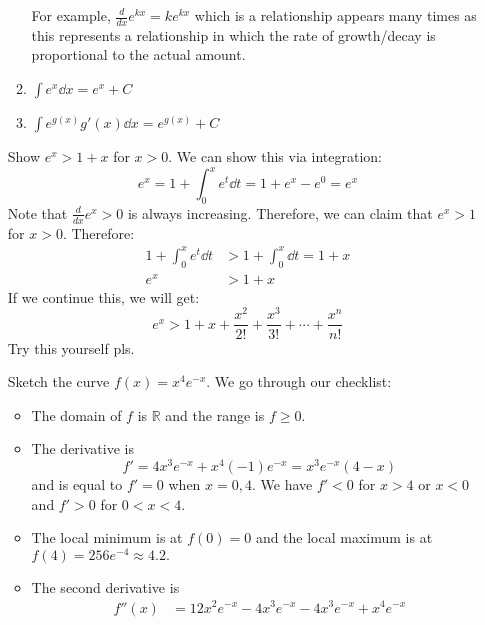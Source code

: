 \begin{itemize}
\begin{enumerate}
        For example, $\frac{d}{dx}e^{kx} = ke^{kx}$ which is a relationship appears many times as this represents a relationship in which the rate of growth/decay is proportional to the actual amount.
        \item $\int e^x \dd{x} = e^x + C$
        \item $\int e^{g(x)}g'(x) \dd{x} = e^{g(x)}+C$
    \end{enumerate}
    \begin{example}
        Show $e^x>1+x$ for $x>0$. We can show this via integration:
        \begin{equation}
            e^x = 1+ \int_0^x e^{t} \dd{t} = 1+e^x-e^0 = e^x
            \label{eq:}
        \end{equation}
        Note that $\frac{d}{dx}e^x > 0$ is always increasing. Therefore, we can claim that $e^x > 1$ for $x>0$. Therefore:
        \begin{align}
            1 + \int_0^x e^t \dd{t} &> 1 + \int_0^x \dd{t} = 1+x \\ 
            e^x &> 1 + x
        \end{align}
        If we continue this, we will get:
        \begin{equation}
            e^x > 1+x+\frac{x^2}{2!}+\frac{x^3}{3!}+\cdots+\frac{x^n}{n!}
            \label{eq:}
        \end{equation}
        Try this yourself pls.
    \end{example}
    \begin{example}
        Sketch the curve $f(x) = x^4e^{-x}$. We go through our checklist:
        \begin{itemize}
            \item The domain of $f$ is $\mathbb{R}$ and the range is $f \ge 0$.
            \item The derivative is
            \begin{equation}
                f' = 4x^3e^{-x} + x^4(-1)e^{-x} = x^3e^{-x}(4-x)
            \end{equation}
            and is equal to $f'=0$ when $x=0,4$. We have $f' < 0$ for $x>4$ or $x<0$ and $f'>0$ for $0<x<4.$
            \item The local minimum is at $f(0)=0$ and the local maximum is at $f(4)=256e^{-4} \approx 4.2.$
            \item The second derivative is
            \begin{align}
                f''(x) &= 12x^2e^{-x} - 4x^3e^{-x} - 4x^3e^{-x} + x^4e^{-x} \\ 

\end{align}
\end{itemize}
\end{example}
\end{itemize}
